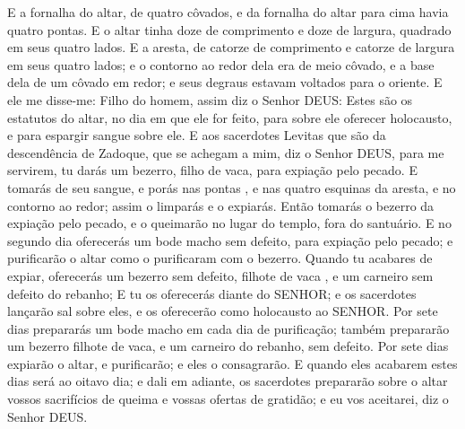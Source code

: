 {E a fornalha do altar, de quatro côvados, e da fornalha do altar para cima havia quatro pontas.
E o altar tinha doze
{} de comprimento e doze de largura, quadrado em seus quatro lados.
E a aresta, de catorze
{} de comprimento e catorze de largura em seus quatro lados; e o contorno ao redor dela era de meio côvado, e a base dela de um côvado em redor; e seus degraus estavam voltados para o oriente.
E ele me disse-me: Filho do homem, assim diz o Senhor DEUS: Estes são os estatutos do altar, no dia em que ele for feito, para sobre ele oferecer holocausto, e para espargir sangue sobre ele.
E aos sacerdotes Levitas que são da descendência
 de Zadoque, que se achegam a mim, diz o Senhor DEUS, para me servirem, tu darás um bezerro, filho de vaca, para expiação pelo pecado.
E tomarás de seu sangue, e porás nas pontas
{} , e nas quatro esquinas da aresta, e no contorno ao redor; assim o limparás e o expiarás.
Então tomarás o bezerro da expiação pelo pecado, e o queimarão no lugar
{} do templo, fora do santuário.
E no segundo dia oferecerás um bode macho sem defeito, para expiação pelo pecado; e purificarão
 o altar como o purificaram com o bezerro.
Quando tu acabares de expiar, oferecerás um bezerro sem defeito, filhote de vaca , e um carneiro sem defeito do rebanho;
E tu os oferecerás diante do SENHOR; e os sacerdotes lançarão sal sobre eles, e os oferecerão como holocausto ao SENHOR.
Por sete dias prepararás um bode macho em cada dia de purificação; também prepararão um bezerro filhote de vaca, e um carneiro do rebanho,
{} sem defeito.
Por sete dias expiarão o altar, e
{} purificarão; e eles o consagrarão.
E quando eles acabarem estes dias será ao oitavo dia; e dali em adiante, os sacerdotes prepararão sobre o altar vossos sacrifícios de queima e vossas ofertas de gratidão; e eu vos aceitarei, diz o Senhor DEUS.

}
